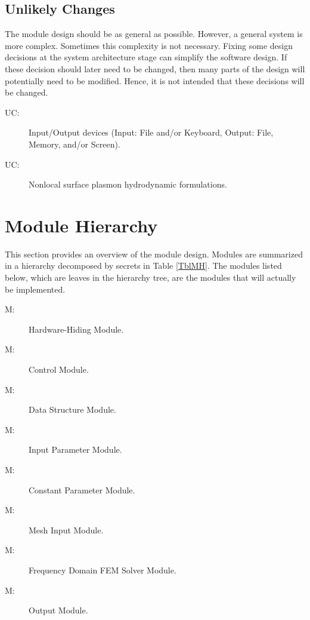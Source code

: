 \documentclass[12pt, titlepage]{article}
\newcounter{ucnum} \newcommand{\uctheucnum}{UC\theucnum}
\newcounter{mnum} \newcommand{\mthemnum}{M\themnum}
\begin{document}
	\subsection{Unlikely Changes} \label{SecUchange}
	
	The module design should be as general as possible. However, a general system is
	more complex. Sometimes this complexity is not necessary. Fixing some design
	decisions at the system architecture stage can simplify the software design. If
	these decision should later need to be changed, then many parts of the design
	will potentially need to be modified. Hence, it is not intended that these
	decisions will be changed.
	
	\begin{description} \item[ \uctheucnum \label{ucIO}:]
		Input/Output devices (Input: File and/or Keyboard, Output: File, Memory, and/or
		Screen). 
		\item[ \uctheucnum \label{ucForm}:] Nonlocal
		surface plasmon hydrodynamic formulations. \end{description}
	
	
	\section{Module Hierarchy} \label{SecMH}
	
	This section provides an overview of the module design. Modules are summarized
	in a hierarchy decomposed by secrets in Table \ref{TblMH}. The modules listed
	below, which are leaves in the hierarchy tree, are the modules that will
	actually be implemented.
	
	\begin{description} \item [ \mthemnum \label{mHH}:]
		Hardware-Hiding Module.
		
		\item [ \mthemnum \label{mSC}:] \progname{} Control Module.
		
		\item [ \mthemnum \label{mDS}:] Data Structure Module.
		
		\item [ \mthemnum \label{mIP}:] Input Parameter Module.
		
		\item [ \mthemnum \label{mCP}:] Constant Parameter Module.
		
		\item [ \mthemnum \label{mMI}:] Mesh Input Module.
		
		\item [ \mthemnum \label{mFD}:] Frequency Domain FEM Solver
		Module.
		
		\item [ \mthemnum \label{mOut}:] Output Module.
		
	\end{description}
	
\end{document}
